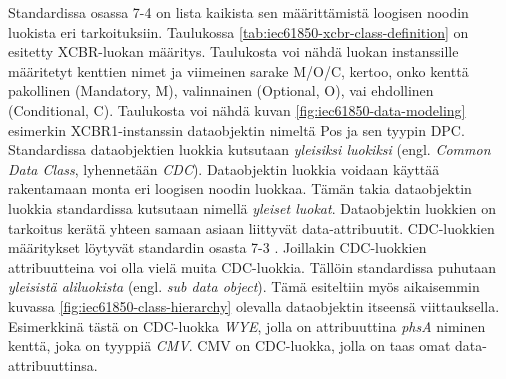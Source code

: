 Standardissa osassa 7-4 on lista kaikista sen määrittämistä loogisen noodin luokista eri tarkoituksiin. Taulukossa \ref{tab:iec61850-xcbr-class-definition} on esitetty XCBR-luokan määritys. Taulukosta voi nähdä luokan instanssille määritetyt kenttien nimet ja viimeinen sarake M/O/C, kertoo, onko kenttä pakollinen (Mandatory, M), valinnainen (Optional, O), vai ehdollinen (Conditional, C). Taulukosta voi nähdä kuvan \ref{fig:iec61850-data-modeling} esimerkin XCBR1-instanssin dataobjektin nimeltä Pos ja sen tyypin DPC. Standardissa dataobjektien luokkia kutsutaan \emph{yleisiksi luokiksi} (engl. \emph{Common Data Class}, lyhennetään \emph{CDC}). Dataobjektin luokkia voidaan käyttää rakentamaan monta eri loogisen noodin luokkaa. Tämän takia dataobjektin luokkia standardissa kutsutaan nimellä \emph{yleiset luokat}. Dataobjektin luokkien on tarkoitus kerätä yhteen samaan asiaan liittyvät data-attribuutit. CDC-luokkien määritykset löytyvät standardin osasta 7-3 \mbox{\cite[s.~26]{IEC61850-1}}. Joillakin CDC-luokkien attribuutteina voi olla vielä muita CDC-luokkia. Tällöin standardissa puhutaan \emph{yleisistä aliluokista} (engl. \emph{sub data object}). Tämä esiteltiin myös aikaisemmin kuvassa \ref{fig:iec61850-class-hierarchy} olevalla dataobjektin itseensä viittauksella. Esimerkkinä tästä on CDC-luokka \emph{WYE}, jolla on attribuuttina \emph{phsA} niminen kenttä, joka on tyyppiä \emph{CMV}. CMV on CDC-luokka, jolla on taas omat data-attribuuttinsa. \mbox{\cite[s.~51,61]{IEC61850-7-2}} \mbox{\cite[s.~36]{IEC61850-7-3}}

